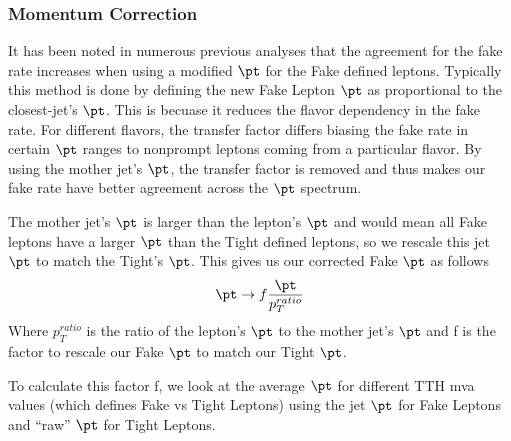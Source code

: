 \subsubsection{Momentum Correction}\label{sec:nonprompt:pt_correction}
It has been noted in numerous previous analyses that the agreement for the fake rate increases when using a modified $\pt$ for the Fake defined leptons. Typically this method is done by defining the new Fake Lepton $\pt$ as proportional to the closest-jet's $\pt$. This is becuase it reduces the flavor dependency in the fake rate. For different flavors, the transfer factor differs biasing the fake rate in certain $\pt$ ranges to nonprompt leptons coming from a particular flavor. By using the mother jet's $\pt$, the transfer factor is removed and thus makes our fake rate have better agreement across the $\pt$ spectrum.

The mother jet's $\pt$ is larger than the lepton's $\pt$ and would mean all Fake leptons have a larger $\pt$ than the Tight defined leptons, so we rescale this jet $\pt$ to match the Tight's $\pt$. This gives us our corrected Fake $\pt$ as follows
\begin{equation*}
  \pt \rightarrow f\frac{\pt}{p_{T}^{ratio}}
\end{equation*}
Where $p_{T}^{ratio}$ is the ratio of the lepton's $\pt$ to the mother jet's $\pt$ and f is the factor to rescale our Fake $\pt$ to match our Tight $\pt$.

To calculate this factor f, we look at the average $\pt$ for different TTH mva values (which defines Fake vs Tight Leptons) using the jet $\pt$ for Fake Leptons and ``raw'' $\pt$ for Tight Leptons.

